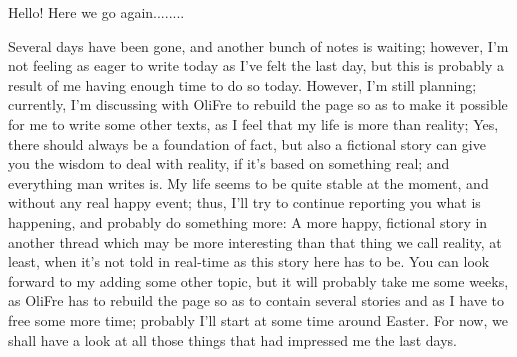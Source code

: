 Hello! Here we go again........

Several days have been gone, and another bunch of notes is waiting; however, I'm not feeling as eager to write today as I've felt the last day, but this is probably a result of me having enough time to do so today. However, I'm still planning; currently, I'm discussing with OliFre to rebuild the page so as to make it possible for me to write some other texts, as I feel that my life is more than reality; Yes, there should always be a foundation of fact, but also a fictional story can give you the wisdom to deal with reality, if it's based on something real; and everything man writes is. 
My life seems to be quite stable at the moment, and without any real happy event; thus, I'll try to continue reporting you what is happening, and probably do something more: A more happy, fictional story in another thread which may be more interesting than that thing we call reality, at least, when it's not told in real-time as this story here has to be. 
You can look forward to my adding some other topic, but it will probably take me some weeks, as OliFre has to rebuild the page so as to contain several stories and as I have to free some more time; probably I'll start at some time around Easter. 
For now, we shall have a look at all those things that had impressed me the last days. 


